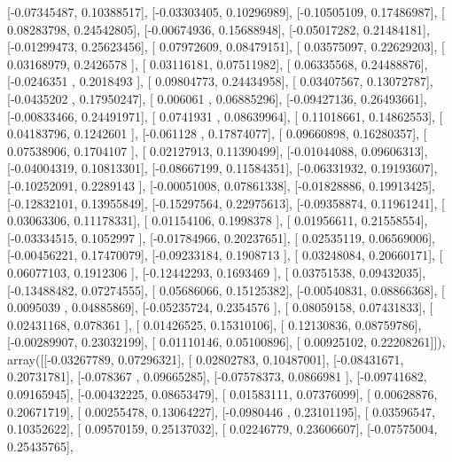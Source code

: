 \documentclass{article}
\begin{document}
       [-0.07345487,  0.10388517],
       [-0.03303405,  0.10296989],
       [-0.10505109,  0.17486987],
       [ 0.08283798,  0.24542805],
       [-0.00674936,  0.15688948],
       [-0.05017282,  0.21484181],
       [-0.01299473,  0.25623456],
       [ 0.07972609,  0.08479151],
       [ 0.03575097,  0.22629203],
       [ 0.03168979,  0.2426578 ],
       [ 0.03116181,  0.07511982],
       [ 0.06335568,  0.24488876],
       [-0.0246351 ,  0.2018493 ],
       [ 0.09804773,  0.24434958],
       [ 0.03407567,  0.13072787],
       [-0.0435202 ,  0.17950247],
       [ 0.006061  ,  0.06885296],
       [-0.09427136,  0.26493661],
       [-0.00833466,  0.24491971],
       [ 0.0741931 ,  0.08639964],
       [ 0.11018661,  0.14862553],
       [ 0.04183796,  0.1242601 ],
       [-0.061128  ,  0.17874077],
       [ 0.09660898,  0.16280357],
       [ 0.07538906,  0.1704107 ],
       [ 0.02127913,  0.11390499],
       [-0.01044088,  0.09606313],
       [-0.04004319,  0.10813301],
       [-0.08667199,  0.11584351],
       [-0.06331932,  0.19193607],
       [-0.10252091,  0.2289143 ],
       [-0.00051008,  0.07861338],
       [-0.01828886,  0.19913425],
       [-0.12832101,  0.13955849],
       [-0.15297564,  0.22975613],
       [-0.09358874,  0.11961241],
       [ 0.03063306,  0.11178331],
       [ 0.01154106,  0.1998378 ],
       [ 0.01956611,  0.21558554],
       [-0.03334515,  0.1052997 ],
       [-0.01784966,  0.20237651],
       [ 0.02535119,  0.06569006],
       [-0.00456221,  0.17470079],
       [-0.09233184,  0.1908713 ],
       [ 0.03248084,  0.20660171],
       [ 0.06077103,  0.1912306 ],
       [-0.12442293,  0.1693469 ],
       [ 0.03751538,  0.09432035],
       [-0.13488482,  0.07274555],
       [ 0.05686066,  0.15125382],
       [-0.00540831,  0.08866368],
       [ 0.0095039 ,  0.04885869],
       [-0.05235724,  0.2354576 ],
       [ 0.08059158,  0.07431833],
       [ 0.02431168,  0.078361  ],
       [ 0.01426525,  0.15310106],
       [ 0.12130836,  0.08759786],
       [-0.00289907,  0.23032199],
       [ 0.01110146,  0.05100896],
       [ 0.00925102,  0.22208261]]), array([[-0.03267789,  0.07296321],
       [ 0.02802783,  0.10487001],
       [-0.08431671,  0.20731781],
       [-0.078367  ,  0.09665285],
       [-0.07578373,  0.0866981 ],
       [-0.09741682,  0.09165945],
       [-0.00432225,  0.08653479],
       [ 0.01583111,  0.07376099],
       [ 0.00628876,  0.20671719],
       [ 0.00255478,  0.13064227],
       [-0.0980446 ,  0.23101195],
       [ 0.03596547,  0.10352622],
       [ 0.09570159,  0.25137032],
       [ 0.02246779,  0.23606607],
       [-0.07575004,  0.25435765],
\end{document}
